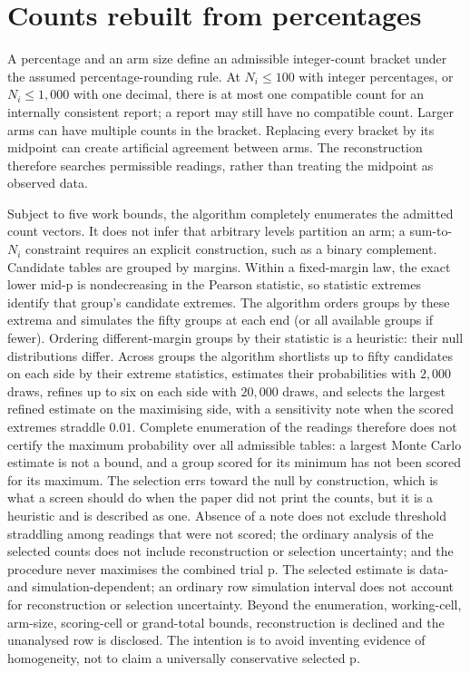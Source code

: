\documentclass[11pt,a4paper]{article}
\begin{document}
\section{Counts rebuilt from percentages}
\label{sec:percent}

A percentage and an arm size define an admissible integer-count bracket under the assumed percentage-rounding rule. At $N_i\le100$ with integer percentages, or $N_i\le1{,}000$ with one decimal, there is at most one compatible count for an internally consistent report; a report may still have no compatible count. Larger arms can have multiple counts in the bracket. Replacing every bracket by its midpoint can create artificial agreement between arms. The reconstruction therefore searches permissible readings, rather than treating the midpoint as observed data.

Subject to five work bounds, the algorithm completely enumerates the admitted count vectors. It does not infer that arbitrary levels partition an arm; a sum-to-$N_i$ constraint requires an explicit construction, such as a binary complement. Candidate tables are grouped by margins. Within a fixed-margin law, the exact lower mid-p is nondecreasing in the Pearson statistic, so statistic extremes identify that group's candidate extremes. The algorithm orders groups by these extrema and simulates the fifty groups at each end (or all available groups if fewer). Ordering different-margin groups by their statistic is a heuristic: their null distributions differ. Across groups the algorithm shortlists up to fifty candidates on each side by their extreme statistics, estimates their probabilities with $2{,}000$ draws, refines up to six on each side with $20{,}000$ draws, and selects the largest refined estimate on the maximising side, with a sensitivity note when the scored extremes straddle $0.01$. Complete enumeration of the readings therefore does not certify the maximum probability over all admissible tables: a largest Monte Carlo estimate is not a bound, and a group scored for its minimum has not been scored for its maximum. The selection errs toward the null by construction, which is what a screen should do when the paper did not print the counts, but it is a heuristic and is described as one. Absence of a note does not exclude threshold straddling among readings that were not scored; the ordinary analysis of the selected counts does not include reconstruction or selection uncertainty; and the procedure never maximises the combined trial p. The selected estimate is data- and simulation-dependent; an ordinary row simulation interval does not account for reconstruction or selection uncertainty. Beyond the enumeration, working-cell, arm-size, scoring-cell or grand-total bounds, reconstruction is declined and the unanalysed row is disclosed. The intention is to avoid inventing evidence of homogeneity, not to claim a universally conservative selected p.
\end{document}

